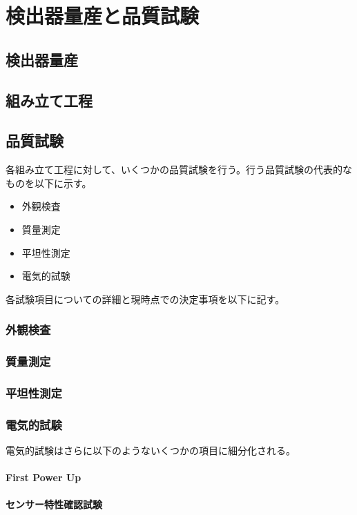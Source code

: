 \chapter{検出器量産と品質試験}

\section{検出器量産}
\section{組み立て工程}
\section{品質試験}
各組み立て工程に対して、いくつかの品質試験を行う。行う品質試験の代表的なものを以下に示す。

\begin{itemize}
  \item 外観検査
  \item 質量測定
  \item 平坦性測定
  \item 電気的試験
\end{itemize}

各試験項目についての詳細と現時点での決定事項を以下に記す。

\subsection{外観検査}

\subsection{質量測定}

\subsection{平坦性測定}

\subsection{電気的試験}
電気的試験はさらに以下のようないくつかの項目に細分化される。
\subsubsection{First Power Up}

\subsubsection{センサー特性確認試験}

